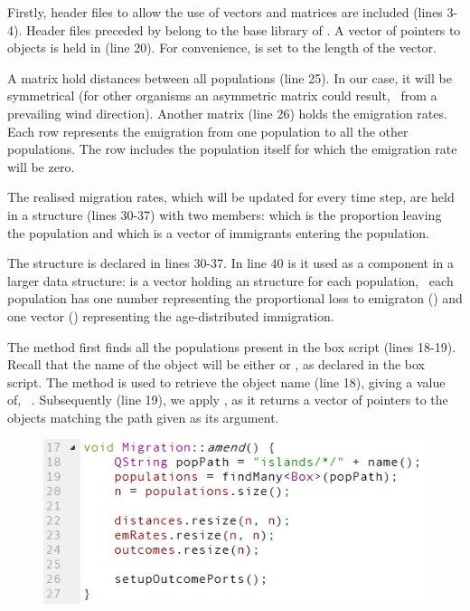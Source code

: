 Firstly, header files to allow the use of vectors and matrices are included (lines 3-4). Header files preceded by  belong to the base library of \US. A vector of pointers to  objects is held in  (line 20). For convenience,  is set to the length of the vector. 

A matrix hold distances between all populations (line 25). In our case, it will be symmetrical (for other organisms an asymmetric matrix could result, \eg\ from a prevailing wind direction). Another matrix (line 26) holds the emigration rates. Each row represents the emigration from one population to all the other populations. The row includes the population itself for which the emigration rate will be zero.

The realised migration rates, which will be updated for every time step, are held in a structure (lines 30-37) with two members:  which is the proportion leaving the population and  which is a vector of immigrants entering the population. 

The  structure is declared in lines 30-37. In line 40 is it used as a component in a larger data structure:  is a vector holding an  structure for each population, \ie\ each population has one number representing the proportional loss to emigraton () and one vector () representing the age-distributed immigration.

The  method first finds all the populations present in the box script (lines 18-19). Recall that the name of the  object will be either  or , as declared in the box script. The  method is used to retrieve the object name (line 18), giving  a value of, \eg\ . Subsequently (line 19), we apply , as it returns a vector of pointers to the  objects matching the path given as its argument.

\begin{figure} [ht]
\centering
\includegraphics[scale=0.7,left]{graphics/migration-cpp-amend}
\end{figure}

